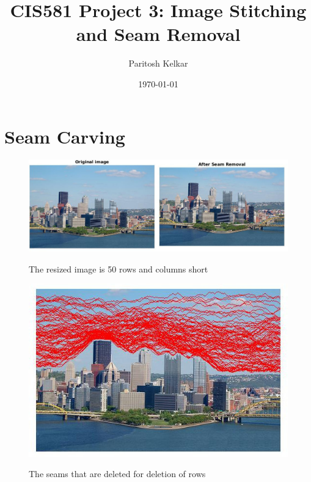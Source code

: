 \documentclass{article}
\title{CIS581 Project 3: Image Stitching and Seam Removal}
\author{Paritosh Kelkar }
\date{\today}
\begin{document}
\maketitle

\newpage

\section*{Seam Carving}

\begin{figure}[h]
\centering
\includegraphics[scale=0.4]{result_afterResize.jpg} 
\label{fig_seamResult}
\caption{The resized image is 50 rows and columns short}
\end{figure}

\begin{figure}[h]
\centering
\includegraphics[scale=0.4]{horSeamRemoval.jpg}
\label{fig_seamHorResult}
\caption{The seams that are deleted for deletion of rows}
\end{figure}
\end{document}
